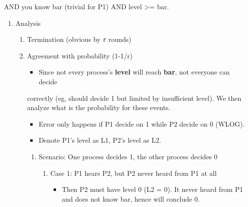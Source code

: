 \documentclass[11pt]{article}
\begin{document}
\begin{enumerate}
\begin{enumerate}
                AND you know bar (trivial for P1) AND level >= bar.
        \end{enumerate}
        \begin{enumerate}
          \item Analysis
                \label{sec:org4d2258e}
                \begin{enumerate}
                  \item Termination (obvious by \texttt{r} rounds)
                        \label{sec:org9880bd7}
                  \item Agreement with probability (1-1/r)
                        \label{sec:orgab96424}
                        \begin{itemize}
                          \item Since not every process's \textbf{level} will reach \textbf{bar}, not everyone can decide
                        \end{itemize}
                        correctly (eg, should decide 1 but limited by insufficient level). We then
                        analyze what is the probability for these events.
                        \begin{itemize}
                          \item Error only happens if P1 decide on 1 while P2 decide on 0 (WLOG).
                          \item Denote P1's level as L1, P2's level as L2.
                        \end{itemize}
                        \begin{enumerate}
                          \item Scenario: One process decides 1, the other process decides 0
                                \label{sec:orgd225902}
                                \begin{enumerate}
                                  \item Case 1: P1 hears P2, but P2 never heard from P1 at all
                                        \label{sec:org5ad3aea}
                                        \begin{itemize}
                                          \item Then P2 must have level 0 (L2 = 0). It never heard from P1 and does not know
                                                bar, hence will conclude 0.
                                                \begin{center}
                                                  \begin{tabular}{lll}

\end{tabular}
\end{center}
\end{itemize}
\end{enumerate}
\end{enumerate}
\end{enumerate}
\end{enumerate}
\end{enumerate}
\end{document}
